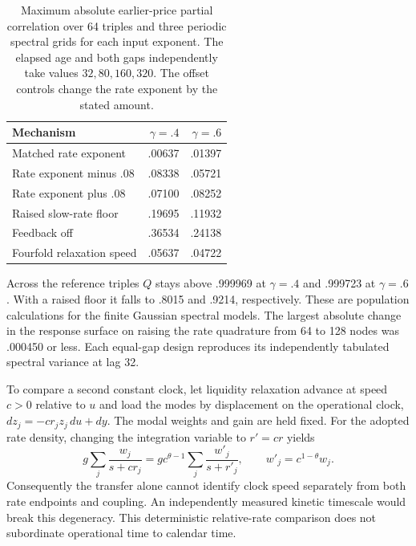 \documentclass[11pt]{article}
\begin{document}
\begin{table}[htbp]\centering\small
\caption{Maximum absolute earlier-price partial correlation over 64 triples
and three periodic spectral grids for each input exponent. The elapsed
age and both gaps independently take values \(32,80,160,320\).
The offset controls change the rate exponent by the stated amount.}
\begin{tabular}{lrr}\toprule
Mechanism & \(\gamma=.4\) & \(\gamma=.6\)\\\midrule
Matched rate exponent & .00637 & .01397\\
Rate exponent minus .08 & .08338 & .05721\\
Rate exponent plus .08 & .07100 & .08252\\
Raised slow-rate floor & .19695 & .11932\\
Feedback off & .36534 & .24138\\
Fourfold relaxation speed & .05637 & .04722\\\bottomrule
\end{tabular}\label{tab:unequal-history}\end{table}
Across the reference triples \(Q\) stays above .999969 at \(\gamma=.4\)
and .999723 at \(\gamma=.6\). With a raised floor it falls to .8015
and .9214, respectively. These are population calculations for the
finite Gaussian spectral models. The largest absolute change in the
response surface on raising the rate quadrature from 64 to 128 nodes
was .000450 or less. Each equal-gap design reproduces its independently
tabulated spectral variance at lag 32.

To compare a second constant clock, let liquidity relaxation advance
at speed \(c>0\) relative to \(u\) and load the modes by displacement
on the operational clock, \(dz_j=-c r_j z_j\,du+dy\).
The modal weights and gain are held fixed. For the adopted rate
density, changing the integration variable to \(r'=cr\) yields
\[
 g\sum_j\frac{w_j}{s+cr_j} =
 g c^{\theta-1}\sum_j\frac{w'_j}{s+r'_j},
 \qquad w'_j=c^{1-\theta}w_j .
\]
Consequently the transfer alone cannot identify clock speed separately
from both rate endpoints and coupling. An independently measured kinetic
timescale would break this degeneracy. This deterministic relative-rate
comparison does not subordinate operational time to calendar time.
\end{document}
